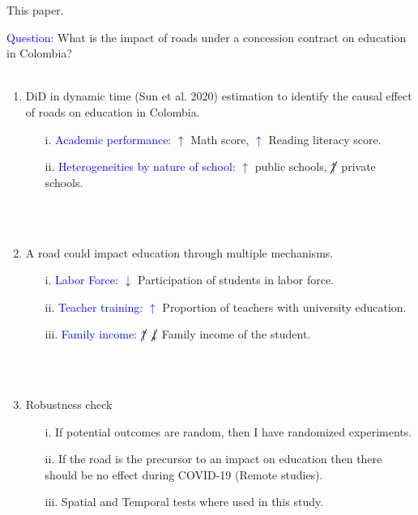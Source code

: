 \documentclass[9pt]{beamer}
\begin{document}
\begin{frame}{This paper.}
\justifying

\textcolor{blue}{Question: } What is the impact of roads under a concession contract on education in Colombia? \\~\\
    \begin{enumerate}
        \item DiD in dynamic time (Sun et al. 2020) estimation to identify the causal effect of roads on education in Colombia. 
        \begin{itemize}  
            \item[i. ] \textcolor{blue}{Academic performance:} \textcolor{blue}{$\uparrow$} Math score,  \textcolor{blue}{$\uparrow$} Reading literacy score.
            \item[ii. ] \textcolor{blue}{Heterogeneities by nature of school:} \textcolor{blue}{$\uparrow$}  public schools, \textcolor{blue}{$\cancel{\uparrow}$ }  private schools.
        \end{itemize} \\~\\
       \item A road could impact education through multiple mechanisms.
        \begin{itemize}  
            \item[i. ] \textcolor{blue}{Labor Force:} \textcolor{blue}{$\downarrow$}  Participation of students in labor force.
            \item[ii. ] \textcolor{blue}{Teacher training:} \textcolor{blue}{$\uparrow$}  Proportion of teachers with university education.
            \item[iii. ] \textcolor{blue}{Family income:} \textcolor{blue}{$\cancel{\uparrow}$ } \textcolor{blue}{$\cancel{\downarrow}$ } Family income of the student.
        \end{itemize} \\~\\
        \item Robustness check
        \begin{itemize}  
            \item[i. ] If potential outcomes are random, then  I have randomized experiments. 
             \item[ii. ] If the road is the precursor to an impact on education then there should be no effect during COVID-19 (Remote studies).
             \item[iii. ] Spatial and Temporal tests where used in this study.
        \end{itemize} \\~\\
    \end{enumerate}
 
    
 \end{frame}
 
\end{document}
